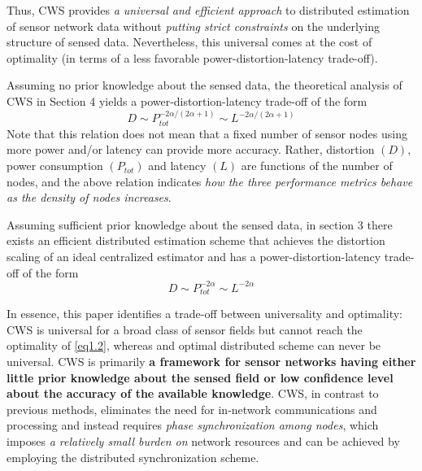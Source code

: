 Thus, CWS provides \emph{a universal and efficient approach} to distributed estimation of sensor network data without \emph{\textcolor[rgb]{0,0,1}{putting strict constraints}} on the underlying structure of sensed data. Nevertheless, this universal comes at the cost of optimality (in terms of a less favorable power-distortion-latency trade-off). 

Assuming no prior knowledge about the sensed data, the theoretical analysis of CWS in Section 4 yields a power-distortion-latency trade-off of the form
\begin{equation}
    D \sim P_{tot}^{-2 \alpha/(2\alpha + 1)} \sim L^{-2\alpha/(2\alpha + 1)}
    \label{eq1.1}
\end{equation}
Note that this relation does not mean that a fixed number of sensor nodes using more power and/or latency can provide more accuracy. Rather, distortion $(D)$, power consumption $(P_{tot})$ and latency $(L)$ are functions of the number of nodes, and the above relation indicates \emph{\textcolor[rgb]{1,0,0}{how the three performance metrics behave as the density of nodes increases}}.

Assuming sufficient prior knowledge about the sensed data, in section 3 there exists an efficient distributed estimation scheme that achieves the distortion scaling of an ideal centralized estimator and has a power-distortion-latency trade-off of the form
\begin{equation}
    D \sim P_{tot}^{-2\alpha} \sim L^{-2\alpha}
    \label{eq1.2}
\end{equation}

In essence, this paper identifies a trade-off between universality and optimality: CWS is universal for a broad class of sensor fields but cannot reach the optimality of \cref{eq1.2}, whereas and optimal distributed scheme can never be universal. CWS is primarily \textbf{\textcolor[rgb]{1,0,0}{a framework for sensor networks having either little prior knowledge about the sensed field or low confidence level about the accuracy of the available knowledge}}. CWS, in contrast to previous methods, eliminates the need for in-network communications and processing and instead requires \emph{\textcolor[rgb]{1,0,0}{phase synchronization among nodes}}, which imposes \emph{\textcolor[rgb]{1,0,0}{a relatively small burden on}} network resources and can be achieved by employing the distributed synchronization scheme. 
